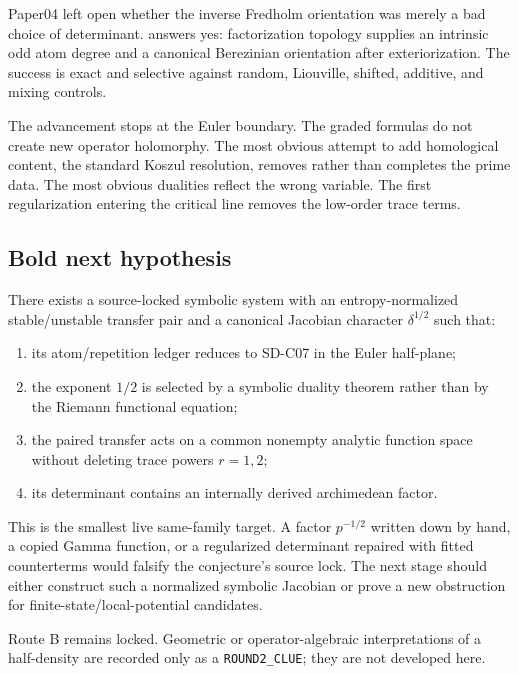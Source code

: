 Paper04 left open whether the inverse Fredholm orientation was merely a bad
choice of determinant.  answers yes: factorization
topology supplies an intrinsic odd atom degree and a canonical Berezinian
orientation after exteriorization. The success is exact and selective
against random, Liouville, shifted, additive, and mixing controls.

The advancement stops at the Euler boundary. The graded formulas do not
create new operator holomorphy. The most obvious attempt to add homological
content, the standard Koszul resolution, removes rather than completes the
prime data. The most obvious dualities reflect the wrong variable. The first
regularization entering the critical line removes the low-order trace terms.

\subsection{Bold next hypothesis}

\begin{conjecture}
\label{conj:half-density}
There exists a source-locked symbolic system with an entropy-normalized
stable/unstable transfer pair and a canonical Jacobian character
$\delta^{1/2}$ such that:
\begin{enumerate}
  \item its atom/repetition ledger reduces to SD-C07 in the Euler half-plane;
  \item the exponent $1/2$ is selected by a symbolic duality theorem rather
  than by the Riemann functional equation;
  \item the paired transfer acts on a common nonempty analytic function
  space without deleting trace powers $r=1,2$;
  \item its determinant contains an internally derived archimedean factor.
\end{enumerate}
\end{conjecture}

This is the smallest live same-family target. A factor $p^{-1/2}$ written
down by hand, a copied Gamma function, or a regularized determinant repaired
with fitted counterterms would falsify the conjecture's source lock. The next
stage should either construct such a normalized symbolic Jacobian or prove a
new obstruction for finite-state/local-potential candidates.

Route B remains locked. Geometric or operator-algebraic interpretations of a
half-density are recorded only as a \texttt{ROUND2\_CLUE}; they are not
developed here.
